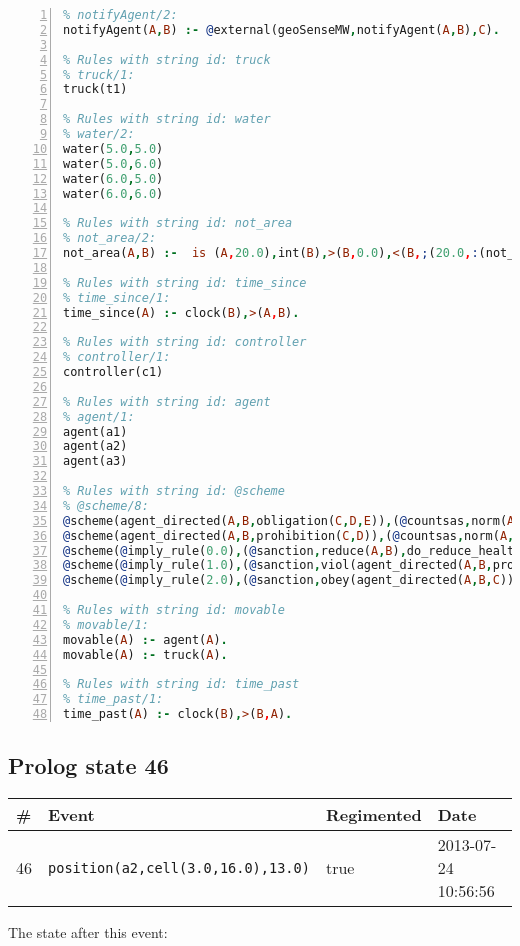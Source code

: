 \documentclass[11pt]{article}\usepackage[utf8]{inputenc}\usepackage{geometry}
\begin{document}
\begin{lstlisting}[language=Prolog, numbers=left]
% Rules with string id: notifyAgent
% notifyAgent/2:
notifyAgent(A,B) :- @external(geoSenseMW,notifyAgent(A,B),C).

% Rules with string id: truck
% truck/1:
truck(t1)

% Rules with string id: water
% water/2:
water(5.0,5.0)
water(5.0,6.0)
water(6.0,5.0)
water(6.0,6.0)

% Rules with string id: not_area
% not_area/2:
not_area(A,B) :-  is (A,20.0),int(B),>(B,0.0),<(B,;(20.0,:(not_area(A,B), is (-(B),20.0)))),int(A),>(A,0.0),<(A,;(20.0,:(area(A,B),-(int(A))))),int(B),>(A,0.0),>(B,0.0),<(A,21.0),<(B,21.0).

% Rules with string id: time_since
% time_since/1:
time_since(A) :- clock(B),>(A,B).

% Rules with string id: controller
% controller/1:
controller(c1)

% Rules with string id: agent
% agent/1:
agent(a1)
agent(a2)
agent(a3)

% Rules with string id: @scheme
% @scheme/8:
@scheme(agent_directed(A,B,obligation(C,D,E)),(@countsas,norm(A,B,F,obligation(C,D,E)),F),false,(listTrue(C)),(time_past(D)),false,[plus(viol(agent_directed(A,B,obligation(C,D,E))))|[]],[plus(obey(agent_directed(A,B,obligation(C,D,E))))|[]])
@scheme(agent_directed(A,B,prohibition(C,D)),(@countsas,norm(A,B,E,prohibition(C,D)),E),(listTrue(C)),false,(false),false,[plus(viol(agent_directed(A,B,prohibition(C,D))))|[]],[plus(obey(agent_directed(A,B,prohibition(C,D))))|[]])
@scheme(@imply_rule(0.0),(@sanction,reduce(A,B),do_reduce_health(A,B),notifyAgent(A,changed(status))),true,false,false,false,[min(reduce(A,B))|[]],[])
@scheme(@imply_rule(1.0),(@sanction,viol(agent_directed(A,B,prohibition(C,D))),do_sanction(D)),true,false,false,false,[min(viol(agent_directed(A,B,prohibition(C,D))))|[]],[])
@scheme(@imply_rule(2.0),(@sanction,obey(agent_directed(A,B,C))),true,false,false,false,[min(obey(agent_directed(A,B,C)))|[]],[])

% Rules with string id: movable
% movable/1:
movable(A) :- agent(A).
movable(A) :- truck(A).

% Rules with string id: time_past
% time_past/1:
time_past(A) :- clock(B),>(B,A).

\end{lstlisting}
\clearpage 
\subsection{Prolog state 46}
\begin{table}[ht]
\centering 
\begin{tabular}{l l l l} 
\textbf{\#} & \textbf{Event} & \textbf{Regimented} & \textbf{Date} \\ [0.5ex] 
\hline
46&\texttt{position(a2,cell(3.0,16.0),13.0)}&true&2013-07-24 10:56:56\\ [1ex] \hline\end{tabular}
\end{table}
The state after this event:
\end{document}
